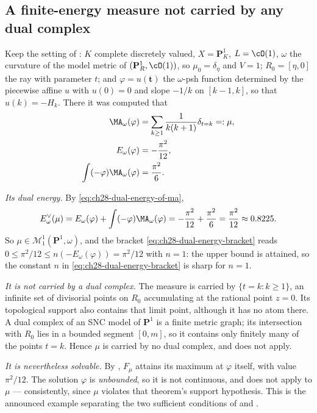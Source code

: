 \subsection{A finite-energy measure not carried by any dual complex}
\label{sec:ch28-not-skeletal}

\begin{example}
\label{ex:ch28-unbounded-dual-energy}
Keep the setting of : $K$ complete
discretely valued, $X=\mathbf P^1_K$, $L=\cO(1)$, $\omega$ the
curvature of the model metric of $(\mathbf P^1_R,\cO(1))$, so
$\mu_0=\delta_\eta$ and $V=1$; $R_0=[\eta,0]$ the ray with parameter
$t$; and $\varphi=u(\mathbf t)$ the $\omega$-psh function determined by
the piecewise affine $u$ with $u(0)=0$ and slope $-1/k$ on
$[k-1,k]$, so that $u(k)=-H_k$.  There it was computed that
\[
 \begin{aligned}
 \MA_\omega(\varphi)
   &=\sum_{k\geq1}\frac1{k(k+1)}\delta_{t=k}=: \mu,\\
 E_\omega(\varphi)&=-\frac{\pi^2}{12},\\
 \int(-\varphi)\MA_\omega(\varphi)&=\frac{\pi^2}6 .
 \end{aligned}
\]

\emph{Its dual energy.}  By \eqref{eq:ch28-dual-energy-of-ma},
\begin{equation}
\label{eq:ch28-unbounded-dual-energy}
 E^\vee_\omega(\mu)
 =E_\omega(\varphi)+\int(-\varphi)\MA_\omega(\varphi)
 =-\frac{\pi^2}{12}+\frac{\pi^2}{6}
 =\frac{\pi^2}{12}\approx0.8225 .
\end{equation}
So $\mu\in\mathcal M^1_1(\mathbf P^1,\omega)$, and the bracket
\eqref{eq:ch28-dual-energy-bracket} reads
$0\leq\pi^2/12\leq n(-E_\omega(\varphi))=\pi^2/12$ with $n=1$: the upper
bound is attained, so the constant $n$ in
\eqref{eq:ch28-dual-energy-bracket} is sharp for $n=1$.

\emph{It is not carried by a dual complex.}  The measure is carried by
$\{t=k:k\geq1\}$, an infinite set of divisorial points on $R_0$
accumulating at the rational point $z=0$.  Its topological support also
contains that limit point, although it has no atom there.  A dual complex of an
SNC model of $\mathbf P^1$ is a finite metric graph; its intersection
with $R_0$ lies in a bounded segment $[0,m]$, so it contains only
finitely many of the points $t=k$.  Hence $\mu$ is carried by no dual
complex, and  does not apply.

\emph{It is nevertheless solvable.}  By
, $F_\mu$ attains its maximum at
$\varphi$ itself, with value $\pi^2/12$.  The solution $\varphi$ is
\emph{unbounded}, so it is not continuous, and
 does not apply to $\mu$ --- consistently, since
$\mu$ violates that theorem's support hypothesis.  This is the announced
example separating the two sufficient conditions of
 and .


\end{example}

